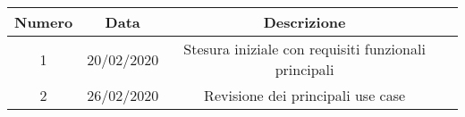 \newpage
{} \\ \\
\begin{tabular}{|c | c | c | c|} 
 	\hline
	 Numero & Data & Descrizione \\ [0.5ex] 
	\hline\hline
	1 & 20/02/2020 & Stesura iniziale con requisiti funzionali principali \\
	\hline
	2 & 26/02/2020 & Revisione dei principali use case\\
	\hline
\end{tabular}

